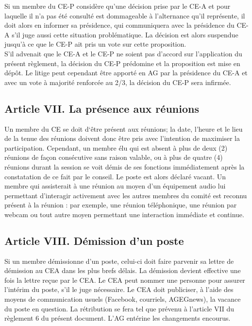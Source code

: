 Si un membre du CE-P considère qu’une décision prise par le CE-A et pour laquelle il n’a pas été consulté est dommageable à l’alternance qu’il représente, il doit alors en informer sa présidence, qui communiquera avec la présidence du CE-A s’il juge aussi cette situation problématique. La décision est alors suspendue jusqu’à ce que le CE-P ait pris un vote sur cette proposition.\\

S’il advenait que le CE-A et le CE-P ne soient pas d’accord sur l’application du présent règlement, la décision du CE-P prédomine et la proposition est mise en dépôt. Le litige peut cependant être apporté en AG par la présidence du CE-A et avec un vote à majorité renforcée au 2/3, la décision du CE-P sera infirmée.

\subsection*{Article VII. La présence aux réunions}
Un membre du CE se doit d‘être présent aux réunions; la date, l’heure et le lieu de la tenue des réunions doivent donc être pris avec l’intention de maximiser la participation. Cependant, un membre élu qui est absent à plus de deux (2) réunions de façon consécutive sans raison valable, ou à plus de quatre (4) réunions durant la session se voit démis de ses fonctions immédiatement après la constatation de ce fait par le conseil. Le poste est alors déclaré vacant. Un membre qui assisterait à une réunion au moyen d’un équipement audio lui permettant d’interagir activement avec les autres membres du comité est reconnu présent à la réunion : par exemple, une réunion téléphonique, une réunion par webcam ou tout autre moyen permettant une interaction immédiate et continue.

\subsection{Article VIII. Démission d’un poste}
Si un membre démissionne d’un poste, celui-ci doit faire parvenir sa lettre de démission au CEA dans les plus brefs délais. La démission devient effective une fois la lettre reçue par le CEA. Le CEA peut nommer une personne pour assurer l’intérim du poste, s’il le juge nécessaire. Le CEA doit publiciser, à l’aide des moyens de communication usuels (Facebook, courriels, AGEGnews), la vacance du poste en question. La rétribution se fera tel que prévenu à l’article VII du règlement 6 du présent document. L’AG entérine les changements encourus.

